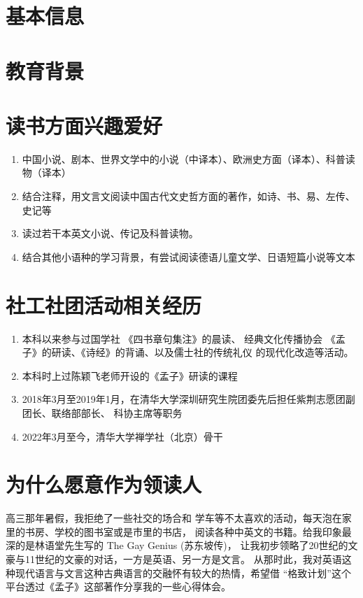 \documentclass[12pt,colorlinks,linkcolor=true]{moderncv}
\begin{document}
\makecvtitle
\section{基本信息}
\section{教育背景}
\section{读书方面兴趣爱好}
\begin{enumerate}
\item 中国小说、剧本、世界文学中的小说（中译本）、欧洲史方面（译本）、科普读物（译本）
\item 结合注释，用文言文阅读中国古代文史哲方面的著作，如诗、书、易、左传、史记等
\item 读过若干本英文小说、传记及科普读物。
\item 结合其他小语种的学习背景，有尝试阅读德语儿童文学、日语短篇小说等文本
\end{enumerate}
\section{社工社团活动相关经历}
\begin{enumerate}
\item 本科以来参与过国学社 《四书章句集注》的晨读、
经典文化传播协会 《孟子》的研读、《诗经》的背诵、以及儒士社的传统礼仪
的现代化改造等活动。
\item 本科时上过陈颖飞老师开设的《孟子》研读的课程
\item
2018年3月至2019年1月，在清华大学深圳研究生院团委先后担任紫荆志愿团副团长、联络部部长、
科协主席等职务
\item 2022年3月至今，清华大学禅学社（北京）骨干
\end{enumerate}
\section{为什么愿意作为领读人}
高三那年暑假，我拒绝了一些社交的场合和
学车等不太喜欢的活动，每天泡在家里的书房、学校的图书室或是市里的书店，
阅读各种中英文的书籍。给我印象最深的是林语堂先生写的 The Gay Genius (苏东坡传)，
让我初步领略了20世纪的文豪与11世纪的文豪的对话，一方是英语、另一方是文言。
从那时此，我对英语这种现代语言与文言这种古典语言的交融怀有较大的热情，希望借
“格致计划”这个平台透过《孟子》这部著作分享我的一些心得体会。
\end{document}
